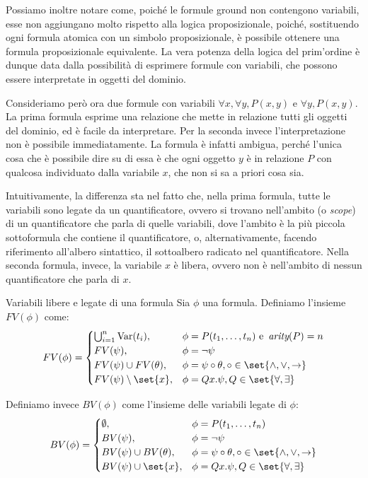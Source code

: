Possiamo inoltre notare come, poiché le formule ground non contengono variabili, esse non aggiungano molto rispetto alla logica proposizionale, poiché, sostituendo ogni formula atomica con un simbolo proposizionale, è possibile ottenere una formula proposizionale equivalente. La vera potenza della logica del prim'ordine è dunque data dalla possibilità di esprimere formule con variabili, che possono essere interpretate in oggetti del dominio.

Consideriamo però ora due formule con variabili \(\forall x, \forall y, P(x,y)\) e \(\forall y, P(x,y)\).
La prima formula esprime una relazione che mette in relazione tutti gli oggetti del dominio, ed è facile da interpretare.
Per la seconda invece l'interpretazione non è possibile immediatamente. La formula è infatti ambigua, perché l'unica cosa che è possibile dire su di essa è che ogni oggetto \(y\) è in relazione \(P\) con qualcosa individuato dalla variabile \(x\), che non si sa a priori cosa sia.

Intuitivamente, la differenza sta nel fatto che, nella prima formula, tutte le variabili sono legate da un quantificatore, ovvero si trovano nell'ambito (o \emph{scope}) di un quantificatore che parla di quelle variabili, dove l'ambito è la più piccola sottoformula che contiene il quantificatore, o, alternativamente, facendo riferimento all'albero sintattico, il sottoalbero radicato nel quantificatore. Nella seconda formula, invece, la variabile \(x\) è libera, ovvero non è nell'ambito di nessun quantificatore che parla di \(x\).

\begin{definition}{Variabili libere e legate di una formula}
  Sia \(\phi\) una formula. Definiamo l'insieme \(FV(\phi)\) come:
  \[FV(\phi) = \begin{cases}
    \bigcup_{i=1}^{n} \Var(t_i), & \phi = P(t_1,\ldots,t_n) \text{ e } \arty(P) = n\\
    FV(\psi), & \phi = \neg \psi\\
    FV(\psi)\cup FV(\theta), & \phi = \psi\circ\theta, \circ \in \set{\land,\lor,\to}\\
    FV(\psi)\setminus\set{x}, & \phi = Q x. \psi, Q\in\set{\forall,\exists}
  \end{cases}\]

  Definiamo invece \(BV(\phi)\) come l'insieme delle variabili legate di \(\phi\):
  \[BV(\phi) = \begin{cases}
    \emptyset, & \phi = P(t_1,\ldots,t_n)\\
    BV(\psi), & \phi = \neg \psi\\
    BV(\psi)\cup BV(\theta), & \phi = \psi\circ\theta, \circ \in \set{\land,\lor,\to}\\
    BV(\psi)\cup\set{x}, & \phi = Q x. \psi, Q\in\set{\forall,\exists}
  \end{cases}\]
\end{definition}

